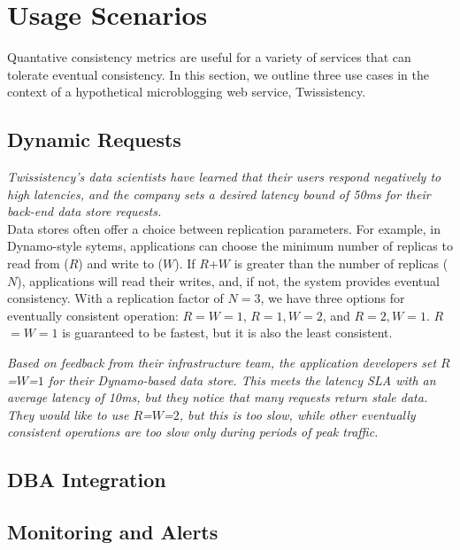 \section{Usage Scenarios}
\label{sec:scenarios}

Quantative consistency metrics are useful for a variety of services
that can tolerate eventual consistency. In this section, we outline
three use cases in the context of a hypothetical microblogging web
service, Twissistency.

\subsection{Dynamic Requests}

\textit{Twissistency's data scientists have learned that their users
  respond negatively to high latencies, and the company sets a desired
  latency bound of 50ms for their back-end data store requests.}\\

Data stores often offer a choice between replication parameters. For
example, in Dynamo-style sytems, applications can choose the minimum
number of replicas to read from ($R$) and write to ($W$). If $R$+$W$
is greater than the number of replicas ($N$), applications will read
their writes, and, if not, the system provides eventual
consistency. With a replication factor of $N=3$, we have three options
for eventually consistent operation: $R$$=$$W$$=$$1$, $R$$=$$1$$,
W$$=$$2$, and $R$$=$$2$$, W$$=$$1$. $R$$=$$W$$=$$1$ is guaranteed to
be fastest, but it is also the least consistent.

\textit{Based on feedback from their infrastructure team, the
  application developers set $R$=$W$=$1$ for their Dynamo-based data
  store. This meets the latency SLA with an average latency of 10ms,
  but they notice that many requests return stale data. They would
  like to use $R$=$W$=$2$, but this is too slow, while other
  eventually consistent operations are too slow only during periods of
  peak traffic.}\\

\subsection{DBA Integration}

\subsection{Monitoring and Alerts}

